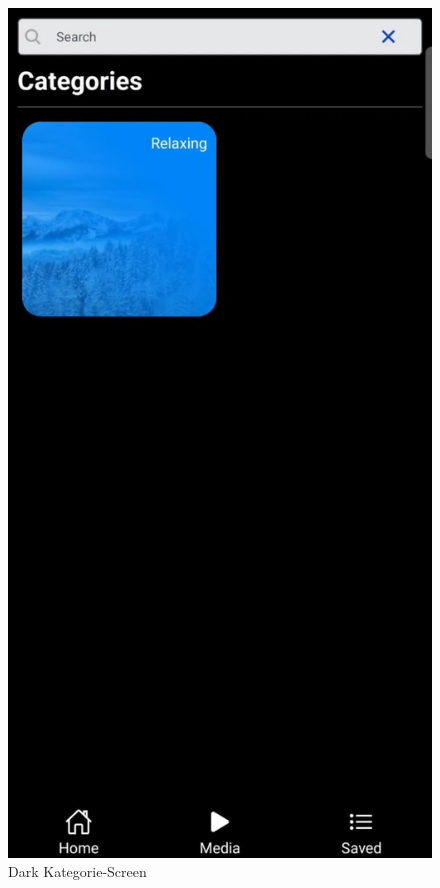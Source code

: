 \begin{figure}[H]
\begin{minipage}{0.5\textwidth}
        \includegraphics[height=1.4\textwidth]{./pics/dKategorie.jpg}
        \caption{Dark Kategorie-Screen}
    \end{minipage}
\end{figure}
